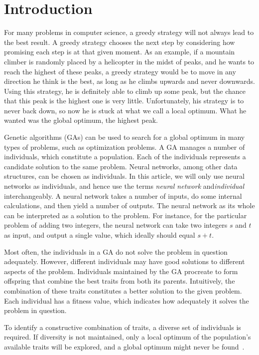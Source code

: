 \section{Introduction}
For many problems in computer science, a greedy strategy will not always lead to the best result. A greedy strategy chooses the next step by considering how promising each step is at that given moment. As an example, if a mountain climber is randomly placed by a helicopter in the midst of peaks, and he wants to reach the highest of these peaks, a greedy strategy would be to move in any direction he think is the best, as long as he climbs upwards and never downwards. Using this strategy, he is definitely able to climb up some peak, but the chance that this peak is the highest one is very little. Unfortunately, his strategy is to never back down, so now he is stuck at what we call a local optimum. What he wanted was the global optimum, the highest peak.
 
Genetic algorithms (GAs) can be used to search for a global optimum in many types of problems, such as optimization problems. A GA manages a number of individuals, which constitute a population. Each of the individuals represents a candidate solution to the same problem. Neural networks, among other data structures, can be chosen as individuals.
In this article, we will only use neural networks as individuals, and hence use the terms \emph{neural network} and\emph{individual} interchangeably.
A neural network takes a number of inputs, do some internal calculations, and then yield a number of outputs.
The neural network as its whole can be interpreted as a solution to the problem.
For instance, for the particular problem of adding two integers, the neural network can take two integers $s$ and $t$ as input, and output a single value, which ideally should equal $s + t$.

Most often, the individuals in a GA do not solve the problem in question adequately.
However, different individuals may have good solutions to different aspects of the problem.
Individuals maintained by the GA procreate to form offspring that combine the best traits from both its parents. Intuitively, the combination of these traits constitutes a better solution to the given problem. Each individual has a fitness value, which indicates how adequately it solves the problem in question.

To identify a constructive combination of traits, a diverse set of individuals is required. If diversity is not maintained, only a local optimum of the population's available traits will be explored, and a global optimum might never be found~\cite{ursem2002diversity,Darwen00doesextra}.

